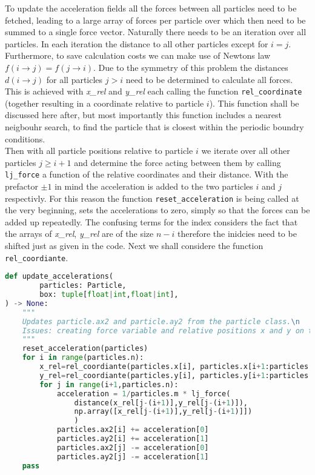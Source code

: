 \documentclass{article}
\begin{document}
To update the acceleration fields all the forces between all particles need to be fetched, 
leading to a large array of forces per particle over which then need to be summed to a single force vector. 
Naturally there needs to be an iteration over all particles. 
In each iteration the distance to all other particles except for $i=j$. 
Furthermore, to save calculation costs we can make use of Newtons law $f(i\to j)=f(j\to i)$. Due to the symmetry of this problem the distances $d(i \to j)$ for all particles $j>i$ need to be determined to calculate all forces. 
This is achieved with \textit{x\_rel} and \textit{y\_rel}  each calling the function \texttt{rel\_coordinate} (together resulting in a coordinate relative to particle $i$). 
This function shall be discussed here after, but most importantly this function includes a nearest neigbouhr search, to find the particle that is closest within the periodic boundry conditions. \\

Then with all particle positions relative to particle $i$ we iterate over all other particles $j\geq i+1$ and determine the force acting between them by calling \texttt{lj\_force} a function of the relative coordinates and their distance. With the prefactor $\pm1$ in mind the acceleration is added to the two particles $i$ and $j$ respectivly. For this reason the function \texttt{reset\_acceleration} is being called at the very beginning, sets the accelerations to zero, simply so that the forces can be added up repeatedly. The confusing terms for the index considers the fact that the arrays of \textit{x\_rel}, \textit{y\_rel} are of the size $n-i$ therefore the inidcies need to be shifted just as given in the code. Next we shall considere the function \texttt{rel\_coordiante}.
\begin{lstlisting}[language=Python, caption=updating accelerations]
def update_accelerations(
        particles: Particle,
        box: tuple[float|int,float|int],    
) -> None:
    """
    Updates particle.ax2 and particle.ay2 from the particle class.\n
    Issues: creating force variable and relative positions x and y on the fly.
    """
    reset_acceleration(particles)
    for i in range(particles.n):
        x_rel=rel_coordiante(particles.x[i], particles.x[i+1:particles.n],box[0]) 
        y_rel=rel_coordiante(particles.y[i], particles.y[i+1:particles.n],box[1])
        for j in range(i+1,particles.n):
            acceleration = 1/particles.m * lj_force(
                distance(x_rel[j-(i+1)],y_rel[j-(i+1)]),
                np.array([x_rel[j-(i+1)],y_rel[j-(i+1)]])
                )
            particles.ax2[i] += acceleration[0]  
            particles.ay2[i] += acceleration[1]
            particles.ax2[j] -= acceleration[0] 
            particles.ay2[j] -= acceleration[1]
    pass
\end{lstlisting}
\end{document}
